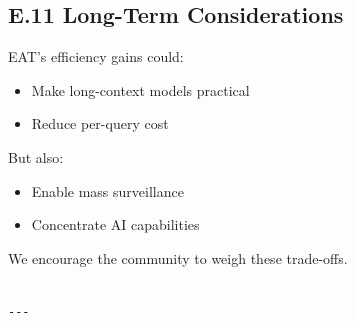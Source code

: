 \subsection{E.11 Long-Term Considerations}

EAT's efficiency gains could:

\begin{itemize}
\item Make long-context models practical
\item Reduce per-query cost

\end{itemize}
But also:

\begin{itemize}
\item Enable mass surveillance
\item Concentrate AI capabilities

\end{itemize}
We encourage the community to weigh these trade-offs.
\begin{lstlisting}

---
\end{lstlisting}


